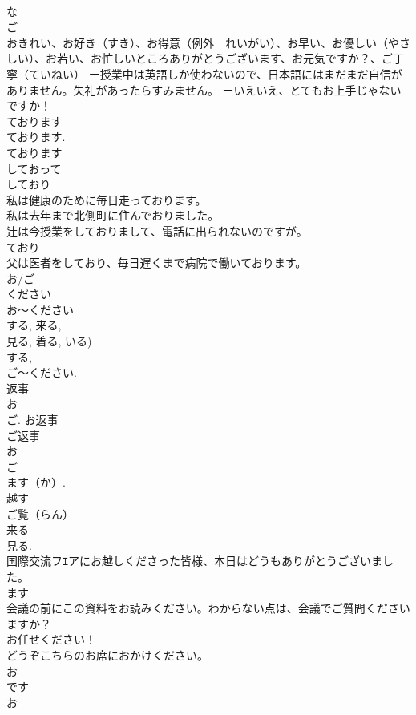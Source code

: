 \documentclass[8pt]{extreport}
\begin{document}
\begin{CJK}{UTF8}{min}
\\	な
\\	ご 
\\	おきれい、お好き（すき）、お得意（例外　れいがい）、お早い、お優しい（やさしい）、お若い、お忙しいところありがとうございます、お元気ですか？、ご丁寧（ていねい） ー授業中は英語しか使わないので、日本語にはまだまだ自信がありません。失礼があったらすみません。 ーいえいえ、とてもお上手じゃないですか！ 
\\	ております	
\\	ております. 
\\	ております 
\\	しておって 
\\	しており 
\\	私は健康のために毎日走っております。 
\\	私は去年まで北側町に住んでおりました。 
\\	辻は今授業をしておりまして、電話に出られないのですが。 
\\	ており 
\\	父は医者をしており、毎日遅くまで病院で働いております。 
\\	お/ご
\\	ください	
\\	お～ください 
\\	する, 来る, 
\\	見る, 着る, いる) 
\\	する, 
\\	ご～ください. 
\\	返事 
\\	お 
\\	ご. お返事 
\\	ご返事 
\\	お 
\\	ご 
\\	ます（か）. 
\\	越す 
\\	ご覧（らん） 
\\	来る 
\\	見る. 
\\	国際交流フｴアにお越しくださった皆様、本日はどうもありがとうございました。 
\\	ます 
\\	会議の前にこの資料をお読みください。わからない点は、会議でご質問くださいますか？ 
\\	お任せください！ 
\\	どうぞこちらのお席におかけください。 
\\	お
\\	です	
\\	お

\end{CJK}
\end{document}
